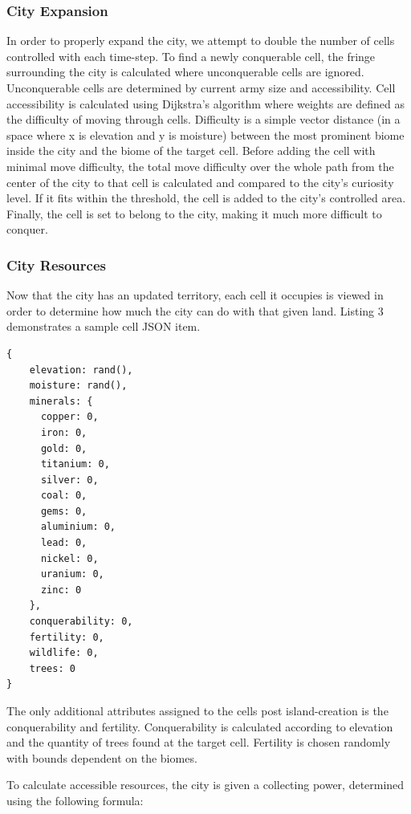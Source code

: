 \subsubsection{City Expansion}
In order to properly expand the city, we attempt to double the number of cells controlled with each time-step. To find a newly conquerable cell, the fringe surrounding the city is calculated where unconquerable cells are ignored. Unconquerable cells are determined by current army size and accessibility. Cell accessibility is calculated using Dijkstra's algorithm where weights are defined as the difficulty of moving through cells. Difficulty is a simple vector distance (in a space where x is elevation and y is moisture) between the most prominent biome inside the city and the biome of the target cell. Before adding the cell with minimal move difficulty, the total move difficulty over the whole path from the center of the city to that cell is calculated and compared to the city's curiosity level. If it fits within the threshold, the cell is added to the city's controlled area. Finally, the cell is set to belong to the city, making it much more difficult to conquer.

\subsubsection{City Resources}
Now that the city has an updated territory, each cell it occupies is viewed in order to determine how much the city can do with that given land. Listing 3 demonstrates a sample cell JSON item.

\begin{lstlisting}[caption=JSON Cell Item]
  {
    elevation: rand(),
    moisture: rand(),
    minerals: {
      copper: 0,
      iron: 0,
      gold: 0,
      titanium: 0,
      silver: 0,
      coal: 0,
      gems: 0,
      aluminium: 0,
      lead: 0,
      nickel: 0,
      uranium: 0,
      zinc: 0
    },
    conquerability: 0,
    fertility: 0,
    wildlife: 0,
    trees: 0
}
\end{lstlisting}

The only additional attributes assigned to the cells post island-creation is the conquerability and fertility. Conquerability is calculated according to elevation and the quantity of trees found at the target cell. Fertility is chosen randomly with bounds dependent on the biomes. 

To calculate accessible resources, the city is given a collecting power, determined using the following formula:

